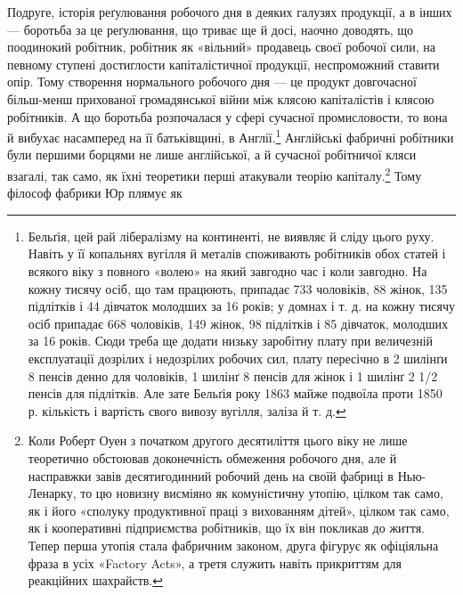 Подруге, історія реґулювання робочого дня в деяких галузях
продукції, а в інших — боротьба за це реґулювання, що триває
ще й досі, наочно доводять, що поодинокий робітник, робітник як
«вільний» продавець своєї робочої сили, на певному ступені достиглости
капіталістичної продукції, неспроможний ставити опір.
Тому створення нормального робочого дня — це продукт довгочасної
більш-менш прихованої громадянської війни між клясою
капіталістів і клясою робітників. А що боротьба розпочалася
у сфері сучасної промисловости, то вона й вибухає насамперед
на її батьківщині, в Англії.\footnote{
Бельґія, цей рай лібералізму на континенті, не виявляє й сліду
цього руху. Навіть у її копальнях вугілля й металів споживають робітників
обох статей і всякого віку з повного «волею» на який завгодно час і
коли завгодно. На кожну тисячу осіб, що там працюють, припадає 733 чоловіків,
88 жінок, 135 підлітків і 44 дівчаток молодших за 16 років;
у домнах і т. д. на кожну тисячу осіб припадає 668 чоловіків, 149 жінок,
98 підлітків і 85 дівчаток, молодших за 16 років. Сюди треба ще додати
низьку заробітну плату при величезній експлуатації дозрілих і недозрілих
робочих сил, плату пересічно в 2 шилінґи 8 пенсів денно для чоловіків,
1 шилінґ 8 пенсів для жінок і 1 шилінґ 2 1/2 пенсів для підлітків.
Але зате Бельґія року 1863 майже подвоїла проти 1850 р. кількість і
вартість свого вивозу вугілля, заліза й т. д.
} Англійські фабричні робітники
були першими борцями не лише англійської, а й сучасної робітничої
кляси взагалі, так само, як їхні теоретики перші атакували
теорію капіталу.\footnote{
Коли Роберт Оуен з початком другого десятиліття цього віку не
лише теоретично обстоював доконечність обмеження робочого дня, але
й насправжки завів десятигодинний робочий день на своїй фабриці в
Нью-Ленарку, то цю новизну висміяно як комуністичну утопію, цілком
так само, як і його «сполуку продуктивної праці з вихованням дітей»,
цілком так само, як і кооперативні підприємства робітників, що їх він покликав
до життя. Тепер перша утопія стала фабричним законом, друга
фігурує як офіціяльна фраза в усіх «Factory Acts», а третя служить
навіть прикриттям для реакційних шахрайств.
} Тому філософ фабрики Юр плямує як